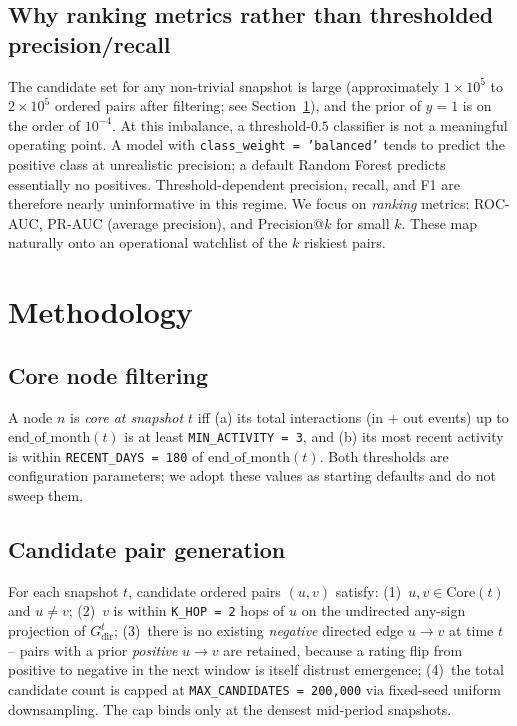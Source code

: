 \documentclass[conference]{IEEEtran}
\newcommand{\code}[1]{\texttt{#1}}
\begin{document}
\subsection{Why ranking metrics rather than thresholded
precision/recall}
The candidate set for any non-trivial snapshot is large (approximately
$1 \times 10^5$ to $2 \times 10^5$ ordered pairs after filtering;
see Section~\ref{sec:method}), and the prior of $y = 1$ is on the
order of $10^{-4}$. At this imbalance, a threshold-$0.5$ classifier is
not a meaningful operating point. A model with
\code{class\_weight = 'balanced'} tends to predict the positive class
at unrealistic precision; a default Random Forest predicts essentially
no positives. Threshold-dependent precision, recall, and F1 are
therefore nearly uninformative in this regime. We focus on
\emph{ranking} metrics: ROC-AUC, PR-AUC (average precision), and
Precision@$k$ for small $k$. These map naturally onto an operational
watchlist of the $k$ riskiest pairs.

\section{Methodology}\label{sec:method}

\subsection{Core node filtering}
A node $n$ is \emph{core at snapshot $t$} iff (a) its total
interactions (in + out events) up to $\mathrm{end\_of\_month}(t)$ is at
least \code{MIN\_ACTIVITY = 3}, and (b) its most recent activity is
within \code{RECENT\_DAYS = 180} of $\mathrm{end\_of\_month}(t)$. Both
thresholds are configuration parameters; we adopt these values as
starting defaults and do not sweep them.

\subsection{Candidate pair generation}
For each snapshot $t$, candidate ordered pairs $(u, v)$ satisfy:
(1)~$u, v \in \mathrm{Core}(t)$ and $u \neq v$;
(2)~$v$ is within \code{K\_HOP = 2} hops of $u$ on the undirected
any-sign projection of $G^t_{\mathrm{dir}}$;
(3)~there is no existing \emph{negative} directed edge $u \to v$ at
time $t$ -- pairs with a prior \emph{positive} $u \to v$ are retained,
because a rating flip from positive to negative in the next window is
itself distrust emergence;
(4)~the total candidate count is capped at
\code{MAX\_CANDIDATES = 200{,}000} via fixed-seed uniform
downsampling. The cap binds only at the densest mid-period snapshots.
\end{document}
